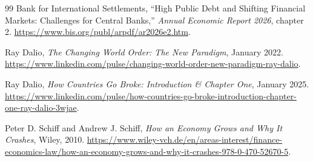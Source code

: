\documentclass[11pt]{article}
\begin{document}
\begin{thebibliography}{99}
Bank for International Settlements, ``High Public Debt and Shifting Financial Markets:
Challenges for Central Banks,'' \emph{Annual Economic Report 2026}, chapter 2.
\url{https://www.bis.org/publ/arpdf/ar2026e2.htm}.

Ray Dalio, \emph{The Changing World Order: The New Paradigm}, January 2022.
\url{https://www.linkedin.com/pulse/changing-world-order-new-paradigm-ray-dalio}.

Ray Dalio, \emph{How Countries Go Broke: Introduction \& Chapter One}, January 2025.
\url{https://www.linkedin.com/pulse/how-countries-go-broke-introduction-chapter-one-ray-dalio-3wjae}.

Peter D. Schiff and Andrew J. Schiff, \emph{How an Economy Grows and Why It Crashes},
Wiley, 2010.  \url{https://www.wiley-vch.de/en/areas-interest/finance-economics-law/how-an-economy-grows-and-why-it-crashes-978-0-470-52670-5}.

\end{thebibliography}
\end{document}
